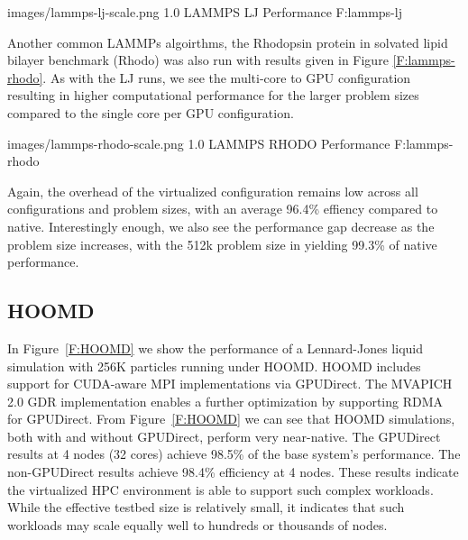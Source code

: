 \documentclass[times,10pt,twocolumn,conference]{IEEEtran}
\begin{document}

  {images/lammps-lj-scale.png}
  {1.0}
  {LAMMPS LJ Performance}
  {F:lammps-lj}


Another common LAMMPs algoirthms, the Rhodopsin protein in solvated lipid bilayer benchmark (Rhodo) was also run with results given in Figure \ref{F:lammps-rhodo}. As with the LJ runs, we see the multi-core to GPU configuration resulting in higher computational performance for the larger problem sizes compared to the single core per GPU configuration.  

  {images/lammps-rhodo-scale.png}
  {1.0}
  {LAMMPS RHODO Performance}
  {F:lammps-rhodo}

Again, the overhead of the virtualized configuration remains low across all configurations and problem sizes, with an average 96.4\% effiency compared to native. Interestingly enough, we also see the performance gap decrease as the problem size increases, with the 512k problem size in yielding 99.3\% of native performance.




\subsection{HOOMD}






In Figure~\ref{F:HOOMD} we show the performance of a Lennard-Jones liquid
simulation with 256K particles running under HOOMD.  HOOMD includes support for CUDA-aware MPI implementations via GPUDirect.  The MVAPICH 2.0 GDR implementation enables a further optimization by supporting RDMA for GPUDirect. From Figure~\ref{F:HOOMD} we can see that HOOMD simulations, both with and without GPUDirect, perform very near-native.  The GPUDirect results at 4 nodes (32 cores) achieve 98.5\% of the base system's performance.  The non-GPUDirect results achieve 98.4\% efficiency at 4 nodes. These results indicate the virtualized HPC environment is able to support such complex workloads. While the effective testbed size is relatively small, it indicates that such workloads may scale equally well to hundreds or thousands of nodes. 
\end{document}
